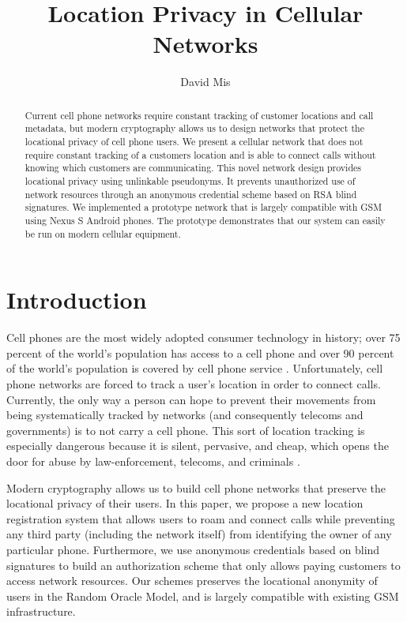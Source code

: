 \documentclass[11pt]{article}
\begin{document}
\title{Location Privacy in Cellular Networks}
\author{David Mis}

\maketitle

\begin{abstract}
	Current cell phone networks require constant tracking of customer locations and call metadata, but modern cryptography allows us to design networks that protect the locational privacy of cell phone users. We present a cellular network that does not require constant tracking of a customers location and is able to connect calls without knowing which customers are communicating. This novel network design provides locational privacy using unlinkable pseudonyms. It prevents unauthorized use of network resources through an anonymous credential scheme based on RSA blind signatures. We implemented a prototype network that is largely compatible with GSM using Nexus S Android phones. The prototype demonstrates that our system can easily be run on modern cellular equipment.
\end{abstract}

\section{Introduction}
Cell phones are the most widely adopted consumer technology in history; over 75 percent of the world's population has access to a cell phone and over 90 percent of the world's population is covered by cell phone service \cite{worldbank2012maximizing}. Unfortunately, cell phone networks are forced to track a user's location in order to connect calls. Currently, the only way a person can hope to prevent their movements from being systematically tracked by networks (and consequently telecoms and governments) is to not carry a cell phone. This sort of location tracking is especially dangerous because it is silent, pervasive, and cheap, which opens the door for abuse by law-enforcement, telecoms, and criminals \cite{blumberg2009whitepaper}.

Modern cryptography allows us to build cell phone networks that preserve the locational privacy of their users. In this paper, we propose a new location registration system that allows users to roam and connect calls while preventing any third party (including the network itself) from identifying the owner of any particular phone. Furthermore, we use anonymous credentials based on blind signatures to build an authorization scheme that only allows paying customers to access network resources. Our schemes preserves the locational anonymity of users in the Random Oracle Model, and is largely compatible with existing GSM infrastructure. 
\end{document}
